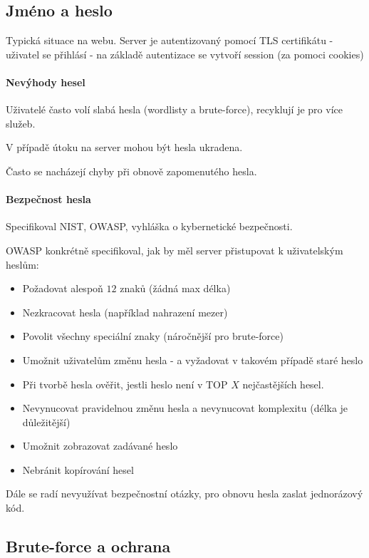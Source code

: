 \documentclass[10pt,a4paper]{article}
\begin{document}
\subsection{Jméno a heslo}
Typická situace na webu.
Server je autentizovaný pomocí TLS certifikátu - uživatel se přihlásí - na základě autentizace se vytvoří session (za pomoci cookies)

\paragraph{Nevýhody hesel}
Uživatelé často volí slabá hesla (wordlisty a brute-force), recyklují je pro více služeb.

V případě útoku na server mohou být hesla ukradena. 

Často se nacházejí chyby při obnově zapomenutého hesla.

\paragraph{Bezpečnost hesla}

Specifikoval NIST, OWASP, vyhláška o kybernetické bezpečnosti.

OWASP konkrétně specifikoval, jak by měl server přistupovat k uživatelským heslům:
\begin{itemize}
	\item Požadovat alespoň $ 12 $ znaků (žádná max délka)
	\item Nezkracovat hesla (například nahrazení mezer)
	\item Povolit všechny speciální znaky (náročnější pro brute-force)
	\item Umožnit uživatelům změnu hesla - a vyžadovat v takovém případě staré heslo
	\item Při tvorbě hesla ověřit, jestli heslo není v TOP $X$ nejčastějších hesel.
	\item Nevynucovat pravidelnou změnu hesla a nevynucovat komplexitu (délka je důležitější)
	\item Umožnit zobrazovat zadávané heslo
	\item Nebránit kopírování hesel
\end{itemize}

Dále se radí nevyužívat bezpečnostní otázky, pro obnovu hesla zaslat jednorázový kód.

\subsection{Brute-force a ochrana}
\end{document}
